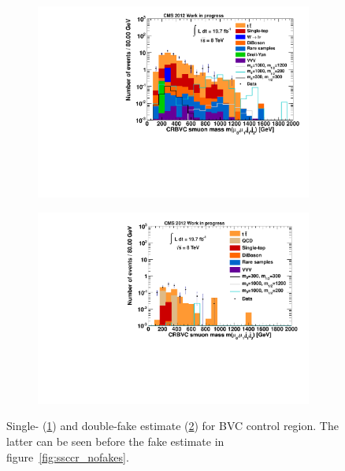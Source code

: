 \begin{figure}[!htbp]
  \centering
  \begin{subfigure}[b]{0.495\textwidth}
    \centering
    \includegraphics[width=\textwidth]{plots/CR6_m_smuon_singlefake.pdf}
    \caption{\label{fig:CRBVC_m_smuon_singlefake}}
  \end{subfigure}
  \begin{subfigure}[b]{0.495\textwidth}
    \centering
    \includegraphics[width=\textwidth]{plots/CR6_m_smuon_doublefake.pdf}
    \caption{\label{fig:CRBVC_m_smuon_doublefake}}
  \end{subfigure}

  \caption{Single- (\ref{fig:CRBVC_m_smuon_singlefake}) and double-fake estimate (\ref{fig:CRBVC_m_smuon_doublefake}) for BVC control region. The latter can be seen before the fake estimate in figure~\ref{fig:ssccr_nofakes}.}
  \label{fig:fakeestimates}
\end{figure}

